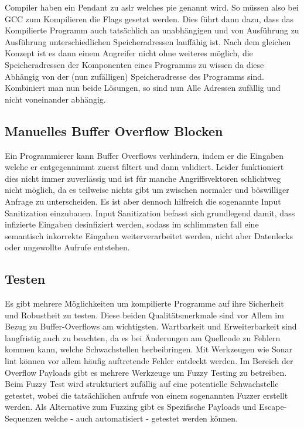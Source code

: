 Compiler haben ein Pendant zu \gls*{aslr} welches \gls*{pie}
genannt wird. So müssen also bei GCC zum Kompilieren die Flags 
gesetzt werden. Dies führt dann dazu, dass das Kompilierte Programm auch tatsächlich an
unabhängigen und von Ausführung zu Ausführung unterschiedlichen Speicheradressen lauffähig
ist.
Nach dem gleichen Konzept ist es dann einem Angreifer nicht ohne weiteres möglich, die
Speicheradressen der Komponenten eines Programms zu wissen da diese Abhängig
von der (nun zufälligen) Speicheradresse des Programms sind. Kombiniert man nun beide Lösungen,
so sind nun Alle Adressen zufällig und nicht voneinander abhängig.

\subsection{Manuelles Buffer Overflow Blocken}
Ein Programmierer kann Buffer Overflows verhindern, indem er die Eingaben
welche er entgegennimmt zuerst filtert und dann validiert. Leider funktioniert
dies nicht immer zuverlässig und ist für manche Angriffsvektoren schlichtweg nicht
möglich, da es teilweise nichts gibt um zwischen normaler und böswilliger Anfrage zu
unterscheiden. Es ist aber dennoch hilfreich die sogenannte Input Sanitization einzubauen.
Input Sanitization befasst sich grundlegend damit, dass infizierte Eingaben desinfiziert
werden, sodass im schlimmsten fall eine semantisch inkorrekte Eingaben weiterverarbeitet
werden, nicht aber Datenlecks oder ungewollte Aufrufe entstehen. \cite{sanitize} 

\subsection{Testen}
Es gibt mehrere Möglichkeiten um kompilierte Programme auf ihre Sicherheit
und Robustheit zu testen. Diese beiden Qualitätsmerkmale sind vor Allem
im Bezug zu Buffer-Overflows am wichtigsten. Wartbarkeit und Erweiterbarkeit
sind langfristig auch zu beachten, da es bei Änderungen am Quellcode
zu Fehlern kommen kann, welche Schwachstellen herbeibringen.
Mit Werkzeugen wie Sonar lint können vor allem häufig auftretende Fehler entdeckt
werden.
Im Bereich der Overflow Payloads gibt es mehrere Werkzeuge um Fuzzy Testing
zu betreiben. Beim Fuzzy Test wird strukturiert zufällig auf eine
potentielle Schwachstelle getestet, wobei die tatsächlichen aufrufe
von einem sogenannten Fuzzer erstellt werden.
Als Alternative zum Fuzzing gibt es Spezifische Payloads und
Escape-Sequenzen welche - auch automatisiert - getestet werden können.

